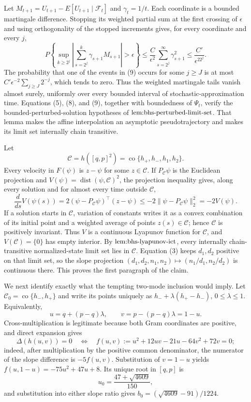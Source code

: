 Let \(M_{t+1}=U_{t+1}-E[U_{t+1}\mid\mathcal F_t]\) and \(\gamma_t=1/t\).  Each coordinate is a bounded martingale difference.  Stopping its weighted partial sum at the first crossing of \(\epsilon\) and using orthogonality of the stopped increments gives, for every coordinate and every \(j\),
\[
 P\left\{\sup_{k\geq2^j}\left|\sum_{s=2^j}^k\gamma_{s+1}M_{s+1}\right|>\epsilon\right\}
 \leq \frac{C}{\epsilon^2}\sum_{s=2^j}^{\infty}\gamma_{s+1}^2
 \leq\frac{C'}{\epsilon^22^j}. \tag{9}
\]
The probability that one of the events in (9) occurs for some \(j\geq J\) is at most \(C'\epsilon^{-2}\sum_{j\geq J}2^{-j}\), which tends to zero.  Thus the weighted martingale tails vanish almost surely, uniformly over every bounded interval of stochastic-approximation time.  Equations (5), (8), and (9), together with boundedness of \(\Psi_t\), verify the bounded-perturbed-solution hypotheses of \(\textnormal{lem:bhs-perturbed-limit-set}\).  That lemma makes the affine interpolation an asymptotic pseudotrajectory and makes its limit set internally chain transitive.

Let
\[
 \mathcal C=h([q,p]^2)=\operatorname{co}\{h_+,h_-,h_1,h_2\}.
\]
Every velocity in \(F(\psi)\) is \(z-\psi\) for some \(z\in\mathcal C\).  If \(P_{\mathcal C}\psi\) is the Euclidean projection and \(V(\psi)=\operatorname{dist}(\psi,\mathcal C)^2\), the projection inequality gives, along every solution and for almost every time outside \(\mathcal C\),
\[
 \frac{d}{ds}V(\psi(s))
 =2(\psi-P_{\mathcal C}\psi)^\top(z-\psi)
 \leq-2\|\psi-P_{\mathcal C}\psi\|_2^2=-2V(\psi). \tag{10}
\]
If a solution starts in \(\mathcal C\), variation of constants writes it as a convex combination of its initial point and a weighted average of points \(z(s)\in\mathcal C\); hence \(\mathcal C\) is positively invariant.  Thus \(V\) is a continuous Lyapunov function for \(\mathcal C\), and \(V(\mathcal C)=\{0\}\) has empty interior.  By \(\textnormal{lem:bhs-lyapunov-ict}\), every internally chain-transitive normalized-state limit set lies in \(\mathcal C\).  Equation (3) keeps \(d_1,d_2\) positive on that limit set, so the slope projection \((d_1,d_2,n_1,n_2)\mapsto(n_1/d_1,n_2/d_2)\) is continuous there.  This proves the first paragraph of the claim.

We next identify exactly what the tempting two-mode inclusion would imply.  Let \(\mathcal C_0=\operatorname{co}\{h_-,h_+\}\) and write its points uniquely as \(h_-+\lambda(h_+-h_-)\), \(0\leq\lambda\leq1\).  Equivalently,
\[
 u=q+(p-q)\lambda,\qquad v=p-(p-q)\lambda=1-u. \tag{11}
\]
Cross-multiplication is legitimate because both Gram coordinates are positive, and direct expansion gives
\[
 \Delta(h(u,v))=0
 \quad\Longleftrightarrow\quad
 f(u,v):=u^2+12uv-21u-64v^2+72v=0; \tag{12}
\]
indeed, after multiplication by the positive common denominator, the numerator of the slope difference is \(-5f(u,v)\).  Substitution of \(v=1-u\) yields \(f(u,1-u)=-75u^2+47u+8\).  Its unique root in \([q,p]\) is
\[
 u_0=\frac{47+\sqrt{4609}}{150},
\]
and substitution into either slope ratio gives \(b_0=(\sqrt{4609}-91)/1224\).

